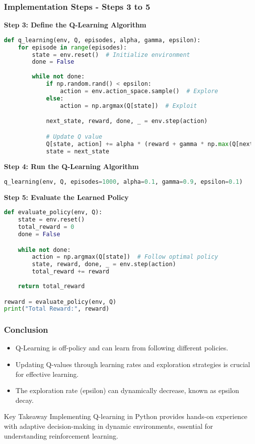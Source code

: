 \documentclass{beamer}
\begin{document}
\begin{frame}[fragile]
    \frametitle{Implementation Steps - Steps 3 to 5}
    \textbf{Step 3: Define the Q-Learning Algorithm}
    \begin{lstlisting}[language=Python]
def q_learning(env, Q, episodes, alpha, gamma, epsilon):
    for episode in range(episodes):
        state = env.reset()  # Initialize environment
        done = False
        
        while not done:
            if np.random.rand() < epsilon:
                action = env.action_space.sample()  # Explore
            else:
                action = np.argmax(Q[state])  # Exploit

            next_state, reward, done, _ = env.step(action)

            # Update Q value
            Q[state, action] += alpha * (reward + gamma * np.max(Q[next_state]) - Q[state, action])
            state = next_state
    \end{lstlisting}

    \textbf{Step 4: Run the Q-Learning Algorithm}
    \begin{lstlisting}[language=Python]
q_learning(env, Q, episodes=1000, alpha=0.1, gamma=0.9, epsilon=0.1)
    \end{lstlisting}

    \textbf{Step 5: Evaluate the Learned Policy}
    \begin{lstlisting}[language=Python]
def evaluate_policy(env, Q):
    state = env.reset()
    total_reward = 0
    done = False

    while not done:
        action = np.argmax(Q[state])  # Follow optimal policy
        state, reward, done, _ = env.step(action)
        total_reward += reward
        
    return total_reward

reward = evaluate_policy(env, Q)
print("Total Reward:", reward)
    \end{lstlisting}
\end{frame}

\begin{frame}
    \frametitle{Conclusion}
    \begin{itemize}
        \item Q-Learning is off-policy and can learn from following different policies.
        \item Updating Q-values through learning rates and exploration strategies is crucial for effective learning.
        \item The exploration rate (epsilon) can dynamically decrease, known as epsilon decay.
    \end{itemize}
    \begin{block}{Key Takeaway}
        Implementing Q-learning in Python provides hands-on experience with adaptive decision-making in dynamic environments, essential for understanding reinforcement learning.
    \end{block}
\end{frame}
\end{document}
